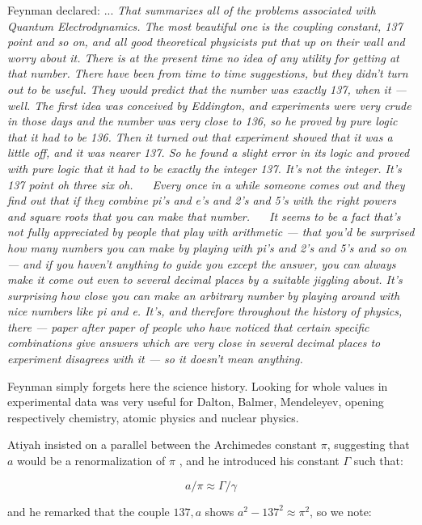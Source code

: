 \documentclass[a4paper,9pt]{article}
\begin{document}
   Feynman declared: ... \textit{That summarizes all of the problems associated with Quantum Electrodynamics. The most beautiful one is the coupling constant, 137 point and so on, and all good theoretical physicists put that up on their wall and worry about it. There is at the present time no idea of any utility for getting at that number. There have been from time to time suggestions, but they didn't turn out to be useful. They would predict that the number was exactly 137, when it — well. The first idea was conceived by Eddington, and experiments were very crude in those days and the number was very close to 136, so he proved by pure logic that it had to be 136. Then it turned out that experiment showed that it was a little off, and it was nearer 137. So he found a slight error in its logic and proved with pure logic that it had to be exactly the integer 137. It's not the integer. It's 137 point oh three six oh.
  Every once in a while someone comes out and they find out that if they combine pi's and e's and 2's and 5's with the right powers and square roots that you can make that number.
  It seems to be a fact that's not fully appreciated by people that play with arithmetic — that you'd be surprised how many numbers you can make by playing with pi's and 2's and 5's and so on — and if you haven't anything to guide you except the answer, you can always make it come out even to several decimal places by a suitable jiggling about. It's surprising how close you can make an arbitrary number by playing around with nice numbers like pi and e. It's, and therefore throughout the history of physics, there — paper after paper of people who have noticed that certain specific combinations give answers which are very close in several decimal places to experiment disagrees with it — so it doesn't mean anything.}
  
Feynman simply forgets here the science history. Looking for whole values in experimental data was very useful for Dalton, Balmer, Mendeleyev, opening respectively chemistry, atomic physics and nuclear physics.

Atiyah insisted on a parallel between the Archimedes constant $\pi$, suggesting that $a$ would be a renormalization of $\pi$ , and he introduced his constant $\Gamma$ such that:

\begin{equation}
a/\pi \approx \Gamma/\gamma
\end{equation}

and he remarked that the couple $137,a$ shows $a^2 - 137^2 \approx \pi^2$, so we note:
\end{document}
